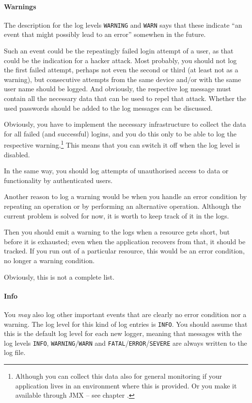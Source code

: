 \paragraph{Warnings} The description for the log levels \verb#WARNING# and \verb#WARN# says that these indicate “an event that might possibly lead to an error” somewhen in the future.

Such an event could be the repeatingly failed login attempt of a user, as that could be the indication for a hacker attack. Most probably, you should not log the first failed attempt, perhaps not even the second or third (at least not as a warning), but consecutive attempts from the same device and/or with the same user name should be logged. And obviously, the respective log message must contain all the necessary data that can be used to repel that attack. Whether the used passwords should be added to the log messages can be discussed.

Obviously, you have to implement the necessary infrastructure to collect the data for all failed (and successful) logins, and you do this only to be able to log the respective warning.\footnote{Although you can collect this data also for general monitoring if your application lives in an environment where this is provided. Or you make it available through JMX – see chapter .} This means that you can switch it off when the log level is disabled.

In the same way, you should log attempts of unauthorised access to data or functionality by authenticated users.

Another reason to log a warning would be when you handle an error condition by repeating an operation or by performing an alternative operation. Although the current problem is solved for now, it is worth to keep track of it in the logs.

Then you should emit a warning to the logs when a resource gets short, but before it is exhausted; even when the application recovers from that, it should be tracked. If you run out of a particular resource, this would be an error condition, no longer a warning condition.

Obviously, this is not a complete list.

\paragraph{Info} You \textit{may} also log other important events that are clearly no error condition nor a warning. The log level for this kind of log entries is \verb#INFO#. You should assume that this is the default log level for each new logger, meaning that messages with the log levels \verb#INFO#, \verb#WARNING#/\verb#WARN# and \verb#FATAL#/\verb#ERROR#/\verb#SEVERE# are always written to the log file.

